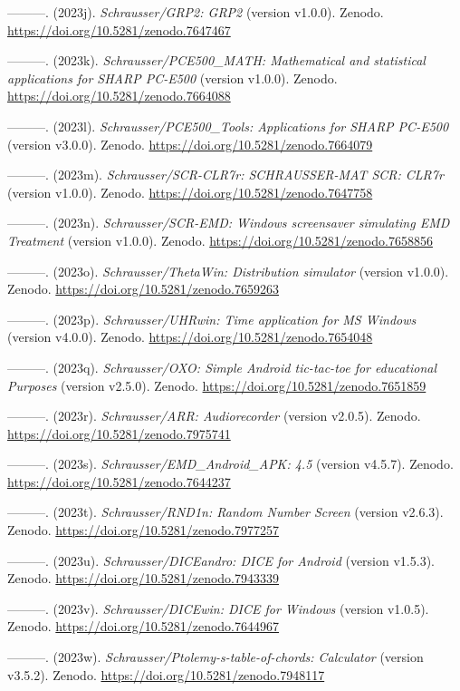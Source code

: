 \documentclass[
]{article}
\begin{document}
---------. (2023j). \emph{Schrausser/GRP2: GRP2} (version v1.0.0).
Zenodo. \url{https://doi.org/10.5281/zenodo.7647467}

---------. (2023k). \emph{Schrausser/PCE500\_MATH: Mathematical and
statistical applications for SHARP PC-E500} (version v1.0.0). Zenodo.
\url{https://doi.org/10.5281/zenodo.7664088}

---------. (2023l). \emph{Schrausser/PCE500\_Tools: Applications for
SHARP PC-E500} (version v3.0.0). Zenodo.
\url{https://doi.org/10.5281/zenodo.7664079}

---------. (2023m). \emph{Schrausser/SCR-CLR7r: SCHRAUSSER-MAT SCR:
CLR7r} (version v1.0.0). Zenodo.
\url{https://doi.org/10.5281/zenodo.7647758}

---------. (2023n). \emph{Schrausser/SCR-EMD: Windows screensaver
simulating EMD Treatment} (version v1.0.0). Zenodo.
\url{https://doi.org/10.5281/zenodo.7658856}

---------. (2023o). \emph{Schrausser/ThetaWin: Distribution simulator}
(version v1.0.0). Zenodo. \url{https://doi.org/10.5281/zenodo.7659263}

---------. (2023p). \emph{Schrausser/UHRwin: Time application for MS
Windows} (version v4.0.0). Zenodo.
\url{https://doi.org/10.5281/zenodo.7654048}

---------. (2023q). \emph{Schrausser/OXO: Simple Android tic-tac-toe for
educational Purposes} (version v2.5.0). Zenodo.
\url{https://doi.org/10.5281/zenodo.7651859}

---------. (2023r). \emph{Schrausser/ARR: Audiorecorder} (version
v2.0.5). Zenodo. \url{https://doi.org/10.5281/zenodo.7975741}

---------. (2023s). \emph{Schrausser/EMD\_Android\_APK: 4.5} (version
v4.5.7). Zenodo. \url{https://doi.org/10.5281/zenodo.7644237}

---------. (2023t). \emph{Schrausser/RND1n: Random Number Screen}
(version v2.6.3). Zenodo. \url{https://doi.org/10.5281/zenodo.7977257}

---------. (2023u). \emph{Schrausser/DICEandro: DICE for Android}
(version v1.5.3). Zenodo. \url{https://doi.org/10.5281/zenodo.7943339}

---------. (2023v). \emph{Schrausser/DICEwin: DICE for Windows} (version
v1.0.5). Zenodo. \url{https://doi.org/10.5281/zenodo.7644967}

---------. (2023w). \emph{Schrausser/Ptolemy-s-table-of-chords:
Calculator} (version v3.5.2). Zenodo.
\url{https://doi.org/10.5281/zenodo.7948117}
\end{document}
